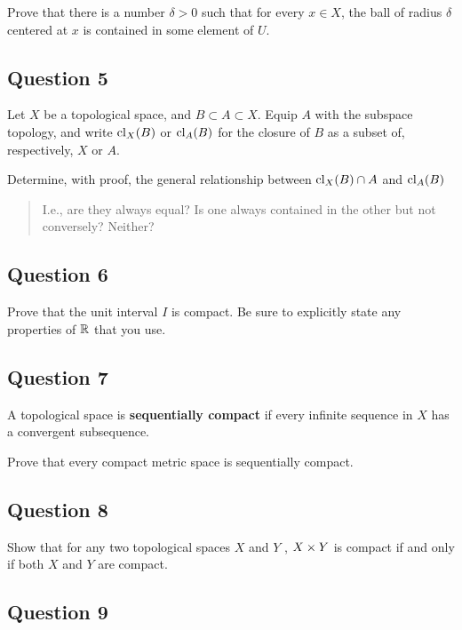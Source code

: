 \documentclass[12pt]{article}
\begin{document}
Prove that there is a number \(\delta > 0\) such that for every
\(x \in X\), the ball of radius \(\delta\) centered at \(x\) is
contained in some element of \(U\).

\hypertarget{question-5-3}{%
\subsection{Question 5}\label{question-5-3}}

Let \(X\) be a topological space, and \(B \subset A \subset X\). Equip
\(A\) with the subspace topology, and write \(\operatorname{cl}_X (B)\) or
\(\operatorname{cl}_A (B)\) for the closure of \(B\) as a subset of, respectively,
\(X\) or \(A\).

Determine, with proof, the general relationship between
\(\operatorname{cl}_X (B) \cap A\) and \(\operatorname{cl}_A (B)\)

\begin{quote}
I.e., are they always equal? Is one always contained in the other but
not conversely? Neither?
\end{quote}

\hypertarget{question-6-3}{%
\subsection{Question 6}\label{question-6-3}}

Prove that the unit interval \(I\) is compact. Be sure to explicitly
state any properties of \({\mathbb{R}}\) that you use.

\hypertarget{question-7-3}{%
\subsection{Question 7}\label{question-7-3}}

A topological space is \textbf{sequentially compact} if every infinite
sequence in \(X\) has a convergent subsequence.

Prove that every compact metric space is sequentially compact.

\hypertarget{question-8-3}{%
\subsection{Question 8}\label{question-8-3}}

Show that for any two topological spaces \(X\) and \(Y\) ,
\(X \times Y\) is compact if and only if both \(X\) and \(Y\) are
compact.

\hypertarget{question-9-3}{%
\subsection{Question 9}\label{question-9-3}}
\end{document}
